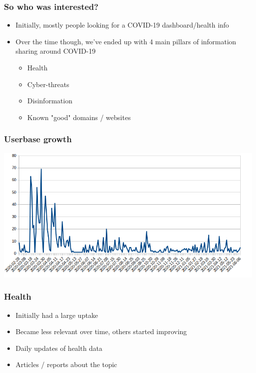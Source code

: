 \begin{frame}
 \frametitle{So who was interested?}
 \begin{itemize}
         \item Initially, mostly people looking for a COVID-19 dashboard/health info
         \item Over the time though, we've ended up with 4 main pillars of information sharing around COVID-19
         \begin{itemize}
              \item Health
              \item Cyber-threats
              \item Disinformation
              \item Known "good" domains / websites
         \end{itemize}
 \end{itemize}
\end{frame}

\begin{frame}
 \frametitle{Userbase growth}
 \includegraphics[width=1\linewidth]{user_regs_daily.png}
\end{frame}

\begin{frame}
 \frametitle{Health}
 \begin{itemize}
         \item Initially had a large uptake
         \item Became less relevant over time, others started improving
         \item Daily updates of health data
         \item Articles / reports about the topic
 \end{itemize}
\end{frame}

